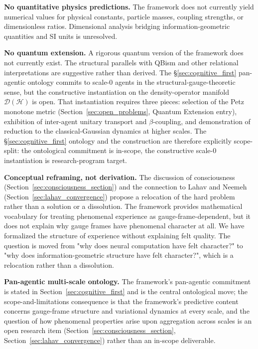 \documentclass[11pt]{article}
\begin{document}
\textbf{No quantitative physics predictions.} The framework does not currently yield numerical values for physical constants, particle masses, coupling strengths, or dimensionless ratios. Dimensional analysis bridging information-geometric quantities and SI units is unresolved.

\textbf{No quantum extension.} A rigorous quantum version of the framework does not currently exist. The structural parallels with QBism and other relational interpretations are suggestive rather than derived. The §\ref{sec:cognitive_first} pan-agentic ontology commits to scale-0 agents in the structural-gauge-theoretic sense, but the constructive instantiation on the density-operator manifold $\mathcal{D}(\mathcal{H})$ is open. That instantiation requires three pieces: selection of the Petz monotone metric (Section~\ref{sec:open_problems}, Quantum Extension entry), exhibition of inter-agent unitary transport and $\beta$-coupling, and demonstration of reduction to the classical-Gaussian dynamics at higher scales. The §\ref{sec:cognitive_first} ontology and the construction are therefore explicitly scope-split: the ontological commitment is in-scope, the constructive scale-0 instantiation is research-program target.

\textbf{Conceptual reframing, not derivation.} The discussion of consciousness (Section~\ref{sec:consciousness_section}) and the connection to Lahav and Neemeh (Section~\ref{sec:lahav_convergence}) propose a relocation of the hard problem rather than a solution or a dissolution. The framework provides mathematical vocabulary for treating phenomenal experience as gauge-frame-dependent, but it does not explain why gauge frames have phenomenal character at all. We have formalized the structure of experience without explaining felt quality. The question is moved from "why does neural computation have felt character?" to "why does information-geometric structure have felt character?", which is a relocation rather than a dissolution.

\textbf{Pan-agentic multi-scale ontology.} The framework's pan-agentic commitment is stated in Section~\ref{sec:cognitive_first} and is the central ontological move; the scope-and-limitations consequence is that the framework's predictive content concerns gauge-frame structure and variational dynamics at every scale, and the question of how phenomenal properties arise upon aggregation across scales is an open research item (Section~\ref{sec:consciousness_section}, Section~\ref{sec:lahav_convergence}) rather than an in-scope deliverable.
\end{document}
